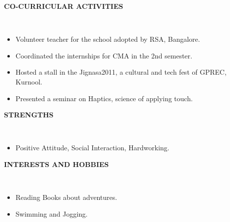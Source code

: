 \documentclass[a4paper,10pt]{article}
\newcommand{\isep}{-2 pt}
\newcommand{\lsep}{-0.5cm}
\newcommand{\resheading}[1]{{\small \colorbox{mygrey}{\begin{minipage}{0.975\textwidth}{\textbf{#1 \vphantom{p\^{E}}}}\end{minipage}}}}
\begin{document}
\resheading{\textbf{CO-CURRICULAR ACTIVITIES} }\\[\lsep]
\begin{itemize} \itemsep \isep
    \item Volunteer teacher for the school adopted by RSA, Bangalore.
    \item Coordinated the internships for CMA in the 2nd semester.
    \item Hosted a stall in the Jignasa2011, a cultural and tech fest of GPREC, Kurnool.
    \item Presented a seminar on Haptics, science of applying touch.
\end{itemize}

\resheading{\textbf{STRENGTHS} }\\[\lsep]
\begin{itemize}
    \item \noindent Positive Attitude, Social Interaction, Hardworking.
\end{itemize}

\resheading{\textbf{INTERESTS AND HOBBIES} }\\[\lsep]
\begin{itemize}
    \item \noindent Reading Books about adventures.
    \item \noindent Swimming and Jogging.

\end{itemize}
\end{document}

